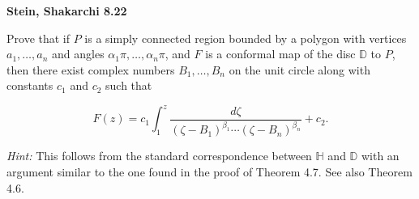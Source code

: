 \textbf{Stein, Shakarchi 8.22}

Prove that if $P$ is a simply connected region bounded by a polygon with vertices $a_1, \dots, a_n$ and angles 
$\alpha_1 \pi, \dots, \alpha_n \pi$, and $F$ is a conformal map of the disc $\mathbb{D}$ to $P$, then there exist 
complex numbers $B_1, \dots, B_n$ on the unit circle along with constants $c_1$ and $c_2$ such that

$$
F(z) = c_1 \int_1^z \frac{d\zeta}{(\zeta - B_1)^{\beta_1} \cdots (\zeta - B_n)^{\beta_n}} + c_2.
$$

\textit{Hint: } This follows from the standard correspondence between $\mathbb{H}$ and $\mathbb{D}$ with an argument 
similar to the one found in the proof of Theorem 4.7. See also Theorem 4.6.

\begin{solution}
  \ \\
\end{solution}
